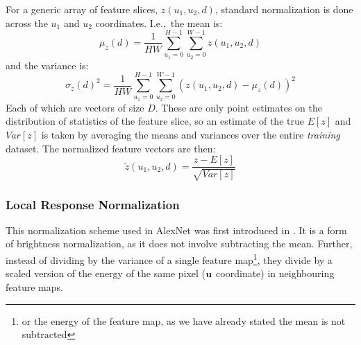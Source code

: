       For a generic array of feature slices, $z(u_1,u_2,d)$,
      standard normalization is done across the $u_1$ and $u_2$ coordinates. I.e.,\
      the mean is:
      \begin{equation}
        \mu_z(d) = \frac{1}{HW} \sum_{u_1=0}^{H-1}\sum_{u_2=0}^{W-1}
        z(u_1,u_2,d) 
      \end{equation}
      and the variance is:
      \begin{equation}
        \sigma_z{(d)}^2 = \frac{1}{HW} \sum_{u_1=0}^{H-1}\sum_{u_2=0}^{W-1}
        {(z(u_1,u_2,d)-\mu_z(d))}^2
      \end{equation}
      Each of which are vectors of size $D$. These are only point estimates on
      the distribution of statistics of the feature slice, so an estimate of
      the true $E[z]$ and $Var[z]$ is taken by averaging the means and
      variances over the entire \emph{training} dataset. The normalized feature
      vectors are then:
      \begin{equation}
        \tilde{z}(u_1,u_2,d) = \frac{z-E[z]}{\sqrt{Var[z]}} \label{eq:normalization}
      \end{equation}
        
\subsubsection{Local Response Normalization}
      This normalization scheme used in AlexNet was first introduced in 
      \citep{jarrett_what_2009}. It is a form of brightness
      normalization, as it does not involve subtracting the mean. Further,
      instead of dividing by the variance of a single feature map\footnote{or
      the energy of the feature map, as we have already stated the mean is not
      subtracted}, they divide by a scaled version of the energy of the same
      pixel ($\mathbf{u}$ coordinate) in neighbouring feature maps.

